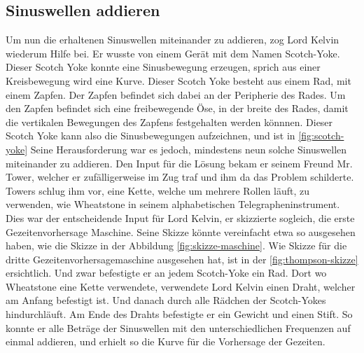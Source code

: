 \subsection{Sinuswellen addieren}

Um nun die erhaltenen Sinuswellen miteinander zu addieren, zog Lord Kelvin wiederum Hilfe bei.
Er wusste von einem Gerät mit dem Namen Scotch-Yoke.
Dieser Scotch Yoke konnte eine Sinusbewegung erzeugen, sprich aus einer Kreisbewegung wird eine Kurve.
Dieser Scotch Yoke besteht aus einem Rad, mit einem Zapfen.
Der Zapfen befindet sich dabei an der Peripherie des Rades.
Um den Zapfen befindet sich eine freibewegende Öse, in der breite des Rades, damit die vertikalen Bewegungen des Zapfens festgehalten werden könnnen.
Dieser Scotch Yoke kann also die Sinusbewegungen aufzeichnen, und ist in \ref{fig:scotch-yoke}
Seine Herausforderung war es jedoch, mindestens neun solche Sinuswellen miteinander zu addieren.
Den Input für die Lösung bekam er seinem Freund Mr. Tower, welcher er zufälligerweise im Zug traf und ihm da das Problem schilderte.
Towers schlug ihm vor, eine Kette, welche um mehrere Rollen läuft, zu verwenden, wie Wheatstone in seinem alphabetischen Telegrapheninstrument.
Dies war der entscheidende Input für Lord Kelvin, er skizzierte sogleich, die erste Gezeitenvorhersage Maschine. Seine Skizze könnte vereinfacht etwa so ausgesehen haben, wie die Skizze in der Abbildung \ref{fig:skizze-maschine}.
Wie Skizze für die dritte Gezeitenvorhersagemaschine ausgesehen hat, ist in der \ref{fig:thompson-skizze} ersichtlich. 
Und zwar befestigte er an jedem Scotch-Yoke ein Rad.
Dort wo Wheatstone eine Kette verwendete, verwendete Lord Kelvin einen Draht, welcher am Anfang befestigt ist.
Und danach durch alle Rädchen der Scotch-Yokes hindurchläuft.
Am Ende des Drahts befestigte er ein Gewicht und einen Stift.
So konnte er alle Beträge der Sinuswellen mit den unterschiedlichen Frequenzen auf einmal addieren, und erhielt so die Kurve für die Vorhersage der Gezeiten.


